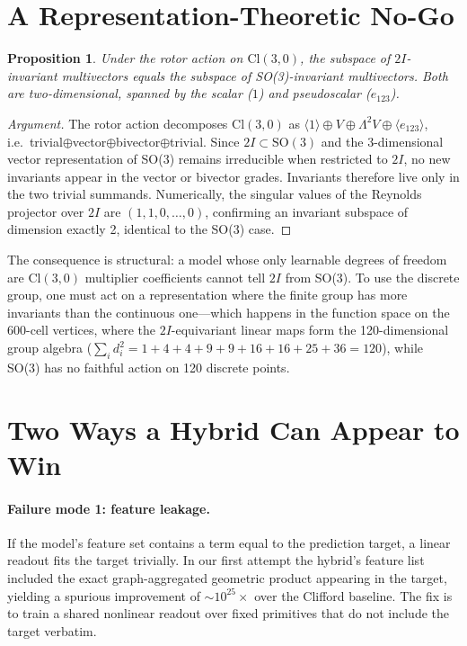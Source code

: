 \documentclass[10pt]{article}
\newtheorem{proposition}{Proposition}
\begin{document}
\section{A Representation-Theoretic No-Go}
\label{sec:nogo}

\begin{proposition}
Under the rotor action on $\mathrm{Cl}(3,0)$, the subspace of $2I$-invariant multivectors equals the subspace of SO(3)-invariant multivectors. Both are two-dimensional, spanned by the scalar ($1$) and pseudoscalar ($e_{123}$).
\end{proposition}

\begin{proof}[Argument]
The rotor action decomposes $\mathrm{Cl}(3,0)$ as $\langle 1\rangle\oplus V\oplus\Lambda^2 V\oplus\langle e_{123}\rangle$, i.e.\ trivial$\oplus$vector$\oplus$bivector$\oplus$trivial.
Since $2I\subset\mathrm{SO}(3)$ and the 3-dimensional vector representation of SO(3) remains irreducible when restricted to $2I$, no new invariants appear in the vector or bivector grades.
Invariants therefore live only in the two trivial summands.
Numerically, the singular values of the Reynolds projector over $2I$ are $(1,1,0,\ldots,0)$, confirming an invariant subspace of dimension exactly 2, identical to the SO(3) case.
\end{proof}

The consequence is structural: a model whose only learnable degrees of freedom are $\mathrm{Cl}(3,0)$ multiplier coefficients cannot tell $2I$ from SO(3).
To use the discrete group, one must act on a representation where the finite group has more invariants than the continuous one---which happens in the function space on the 600-cell vertices, where the $2I$-equivariant linear maps form the 120-dimensional group algebra ($\sum_i d_i^2 = 1+4+4+9+9+16+16+25+36 = 120$), while SO(3) has no faithful action on 120 discrete points.

\section{Two Ways a Hybrid Can Appear to Win}
\label{sec:failure}

\paragraph{Failure mode 1: feature leakage.}
If the model's feature set contains a term equal to the prediction target, a linear readout fits the target trivially.
In our first attempt the hybrid's feature list included the exact graph-aggregated geometric product appearing in the target, yielding a spurious improvement of $\sim 10^{25}\times$ over the Clifford baseline.
The fix is to train a shared nonlinear readout over fixed primitives that do not include the target verbatim.
\end{document}
